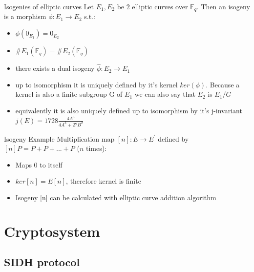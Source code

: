 \documentclass[handout]{beamer}
\begin{document}
\begin{frame}{Isogenies of elliptic curves}  %
Let $E_1,E_2$ be 2 elliptic curves over $\mathbb{F}_q$. Then an isogeny is a morphism $\phi: E_1 \to E_2$ s.t.:
\begin{itemize}[\textbullet]
	\item $\phi(0_{E_1})= 0_{E_2}$\pause
	\item $\#E_1(\mathbb{F}_q) = \#E_2(\mathbb{F}_q)$\pause
	\item there exists a dual isogeny $\hat{\phi}: E_2 \to E_1$\pause
	\item up to isomorphism it is uniquely defined by it's kernel $ker(\phi)$. Because a kernel is also a finite subgroup G of $E_1$ we can also say that $E_2$ is $E_1/G$\pause
	\item equivalently it is also uniquely defined up to isomorphism by it's j-invariant $j(E)=1728\frac{4A^3}{4A^3+27B^2}$
\end{itemize}
\end{frame}

\begin{frame}{Isogeny Example}
	Multiplication map $[n]: E \to E^{\prime}$ defined by $[n]P = P + P + ...+ P$ ($n$ times):
	\begin{itemize}[\textbullet]
		\item Maps 0 to itself
		\item $ker[n] = E[n]$, therefore kernel is finite 
		\item Isogeny [n] can be calculated with elliptic curve addition algorithm %
		
	\end{itemize}

\end{frame}





\section{Cryptosystem}

\subsection{SIDH protocol}
\end{document}
